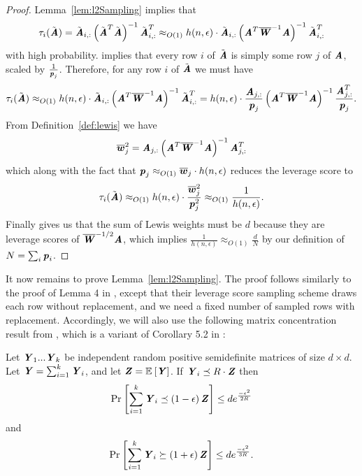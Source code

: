 \begin{proof}
	Lemma~\ref{lem:l2Sampling} implies that 
	\[ \tau_i(\tilde{\AA}) = \tilde{\AA}_{i,:}\left(\tilde{\AA}^T\tilde{\AA}\right)^{-1}\tilde{\AA}_{i,:}^T \approx_{O(1)} h(n,\epsilon)\cdot \tilde{\AA}_{i,:}\left(\AA^T\LW^{-1}\AA\right)^{-1}\tilde{\AA}_{i,:}^T 
	\] 
	with high probability. 
	 implies that every row $i$ of $\tilde{\AA}$ is simply some row $j$ of $\AA$, scaled by $\frac{1}{\pp_j}$. 
	Therefore, for any row $i$ of $\tilde{\AA}$ we must have 
	\[\tau_i(\tilde{\AA}) \approx_{O(1)} h(n,\epsilon) \cdot \tilde{\AA}_{i,:}\left(\AA^T\LW^{-1}\AA\right)^{-1}\tilde{\AA}_{i,:}^T  =  h(n,\epsilon) \cdot \frac{\AA_{j,:}}{\pp_j}\left(\AA^T\LW^{-1}\AA\right)^{-1}\frac{\AA_{j,:}^T}{\pp_j}.
	\]
	From Definition~\ref{def:lewis} we have 
	\[\lw_j^2 = \AA_{j,:}\left(\AA^T\LW^{-1}\AA\right)^{-1}\AA_{j,:}^T\]
	which along with the fact that $\pp_j \approx_{O(1)} \lw_j \cdot h(n,\epsilon)$ reduces the leverage score to
	\[ \tau_i(\tilde{\AA}) \approx_{O(1)} h(n,\epsilon) \cdot \frac{\lw_j^2}{\pp_j^2} \approx_{O(1)}\frac{1}{h(n,\epsilon)}.
	\]
	Finally  gives us that the sum of Lewis weights must be $d$ because they are leverage scores of $\LW^{-1/2}\AA$, which implies $\frac{1}{h(n,\epsilon)} \approx_{O(1)} \frac{d}{N}$ by our definition of $N = \sum_i \pp_i$.
\end{proof}

It now remains to prove Lemma~\ref{lem:l2Sampling}.
The proof follows similarly to the proof of Lemma 4 in \cite{CohenLMMPS15}, except that their leverage score sampling scheme draws each row without replacement, and we need a fixed number of sampled rows with replacement. Accordingly, we will also use the following matrix concentration result from \cite{Harvey12}, which is a variant of Corollary 5.2 in \cite{Tropp12}:

\begin{lemma} 
	\label{lem:matrixConcentration}
	Let $\YY_1...\YY_k$ be independent random positive semidefinite matrices of size $d \times d$. Let $\YY= \sum_{i=1}^k \YY_i$, and let $\ZZ = \expec{ }{\YY}$. If $\YY_i \preceq R\cdot\ZZ$ then
	\[ \prob{}{\sum_{i=1}^k \YY_i \preceq \left( 1 - \epsilon \right) \ZZ} \leq de^{\frac{-\epsilon^2}{2R}} \]
	and 
	\[ \prob{}{\sum_{i=1}^k \YY_i \succeq \left( 1 + \epsilon \right) \ZZ} \leq de^{\frac{-\epsilon^2}{3R}}. \]
\end{lemma}

